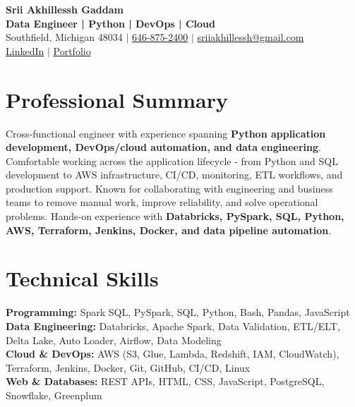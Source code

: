 \documentclass[letterpaper,10pt]{article}
\begin{document}
\fontsize{9.35pt}{10.45pt}\selectfont

\begin{center}
    {\LARGE \textbf{Srii Akhillessh Gaddam}} \\[-1pt]
    \textbf{Data Engineer | Python | DevOps | Cloud} \\[2pt]
    Southfield, Michigan 48034 $|$
    \href{tel:6468752400}{646-875-2400} $|$
    \href{mailto:sriiakhillessh@gmail.com}{sriiakhillessh@gmail.com} \\[1pt]
    \href{https://www.linkedin.com/in/srii-akhiilessh-gaddam-b48668191/}{LinkedIn} $|$
    \href{https://sriiakhillesshg.github.io/portfolio/}{Portfolio}
\end{center}
\vspace{-8pt}

\section{Professional Summary}
\small{Cross-functional engineer with experience spanning \textbf{Python application development, DevOps/cloud automation, and data engineering}. Comfortable working across the application lifecycle - from Python and SQL development to AWS infrastructure, CI/CD, monitoring, ETL workflows, and production support. Known for collaborating with engineering and business teams to remove manual work, improve reliability, and solve operational problems. Hands-on experience with \textbf{Databricks, PySpark, SQL, Python, AWS, Terraform, Jenkins, Docker, and data pipeline automation}.}

\section{Technical Skills}
\small{
\textbf{Programming:} Spark SQL, PySpark, SQL, Python, Bash, Pandas, JavaScript \\
\textbf{Data Engineering:} Databricks, Apache Spark, Data Validation, ETL/ELT, Delta Lake, Auto Loader, Airflow, Data Modeling \\
\textbf{Cloud \& DevOps:} AWS (S3, Glue, Lambda, Redshift, IAM, CloudWatch), Terraform, Jenkins, Docker, Git, GitHub, CI/CD, Linux \\
\textbf{Web \& Databases:} REST APIs, HTML, CSS, JavaScript, PostgreSQL, Snowflake, Greenplum
}

\end{document}
